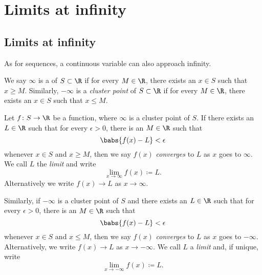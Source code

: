 
\sectionnewpage
\section{Limits at infinity}
\label{sec:limitatinf}



\subsection{Limits at infinity}

As for sequences, a continuous variable can also approach infinity.

\begin{defn}
We say $\infty$ is a \emph{} of $S \subset \R$ if for every
$M \in \R$, there exists an $x \in S$ such that $x \geq M$.  Similarly,
$- \infty$ is a \emph{cluster point} of $S \subset \R$ if for every
$M \in \R$, there exists an $x \in S$ such that $x \leq M$.

%
Let $f \colon S \to \R$ be a function, where 
$\infty$ is a cluster point of $S$.
If there exists an $L \in \R$
such that for every $\epsilon > 0$, there is an $M \in \R$ such that
\begin{equation*}
\babs{f(x) - L} < \epsilon 
\end{equation*}
whenever $x \in S$ and $x \geq M$, then we say $f(x)$
\emph{converges} to $L$
as $x$ goes to $\infty$.  We call $L$ the \emph{limit}
and write
\begin{equation*}
\lim_{x \to \infty} f(x) \coloneqq L .
\end{equation*}
Alternatively we write $f(x) \to L$ as $x \to \infty$.

Similarly, if $-\infty$ is a cluster point of $S$
and
there exists an $L \in \R$
such that for every $\epsilon > 0$, there is an $M \in \R$ such that
\begin{equation*}
\babs{f(x) - L} < \epsilon 
\end{equation*}
whenever $x \in S$ and $x \leq M$, then we say $f(x)$ \emph{converges} to $L$
as $x$ goes to $-\infty$.
Alternatively, we write $f(x) \to L$ as $x \to -\infty$.
We call $L$ a \emph{limit} and, if unique, write
\begin{equation*}
\lim_{x \to -\infty} f(x) \coloneqq L .
\end{equation*}
\end{defn}

